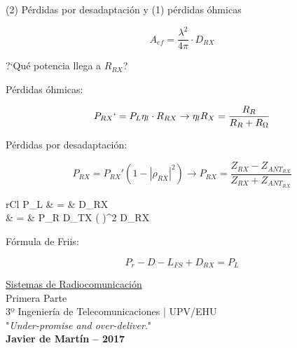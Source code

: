 \documentclass[10pt,portrait, twocolumn]{article}
\begin{document}
\begin{landscape}
\begin{multicols}{3}
(2) Pérdidas por desadaptación y (1) pérdidas óhmicas


\begin{equation*}
A_{ef} = \frac{\lambda^{2}}{4 \pi} \cdot D_{RX}
\end{equation*}

?`Qué potencia llega a $R_{RX}$?

Pérdidas óhmicas:

	\begin{equation*}
	P_{RX}`= P_{L} \eta_{l} \cdot R_{RX} \rightarrow  \eta_{l} R_{X} = \frac{R_{R}}{R_{R} + R_{\Omega}}
	\end{equation*}
	
Pérdidas por desadaptación:

	\begin{equation*}
	P_{RX} = P_{RX}' (1 - |\rho_{RX}|^{2}) \rightarrow P_{RX} = \frac{Z_{RX} - Z_{ANT_{RX}}}{Z_{RX} + Z_{ANT_{RX}}}
	\end{equation*}


\begin{IEEEeqnarray*}{rCl}
			P_{L} & = &  \cdot {} \cdot D_{RX} \\
				 & = & P_{R} \cdot D_{TX} \left(  \right)^{2} D_{RX}
		\end{IEEEeqnarray*}


Fórmula de Friis:

	\begin{equation*}
	P_{r} - D - L_{FS} + D_{RX} = P_{L}
	\end{equation*}

\end{multicols}

\end{landscape}



\begin{framed}
	\begin{center}
    	\Large{\underline{Sistemas de Radiocomunicación}} \\
	\large{Primera Parte} \\
    	\scriptsize{3º Ingeniería de Telecomunicaciones | UPV/EHU}\\
     	"\textsl{Under-promise and over-deliver}." \\
     	\small{\textbf{Javier de Martín -- 2017}}
	\end{center}
\end{framed}
\end{document}
